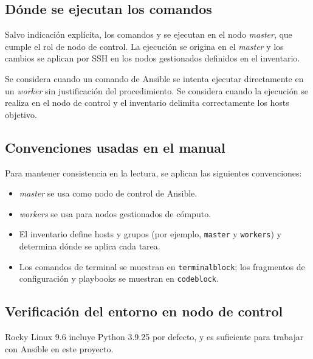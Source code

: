 \subsection{Dónde se ejecutan los comandos}
\label{subsec:ansible_donde_se_ejecutan}

Salvo indicación explícita, los comandos  y  se ejecutan en el nodo \textit{master}, que cumple el rol de nodo de control. La ejecución se origina en el \textit{master} y los cambios se aplican por SSH en los nodos gestionados definidos en el inventario.

\begin{criticalnote}
Se considera \inlinefail cuando un comando de Ansible se intenta ejecutar directamente en un \textit{worker} sin justificación del procedimiento. Se considera \inlineok cuando la ejecución se realiza en el nodo de control y el inventario delimita correctamente los hosts objetivo.
\end{criticalnote}

\subsection{Convenciones usadas en el manual}
\label{subsec:ansible_convenciones_manual}

Para mantener consistencia en la lectura, se aplican las siguientes convenciones:
\begin{itemize}
  \item \textit{master} se usa como nodo de control de Ansible.
  \item \textit{workers} se usa para nodos gestionados de cómputo.
  \item El inventario define hosts y grupos (por ejemplo, \texttt{master} y \texttt{workers}) y determina dónde se aplica cada tarea.
  \item Los comandos de terminal se muestran en \texttt{terminalblock}; los fragmentos de configuración y playbooks se muestran en \texttt{codeblock}.
\end{itemize}


\subsection{Verificación del entorno en nodo de control}
\label{subsec:ansible_verificacion_control_node}

Rocky Linux 9.6 incluye Python 3.9.25 por defecto, y es suficiente para trabajar con Ansible en este proyecto.

